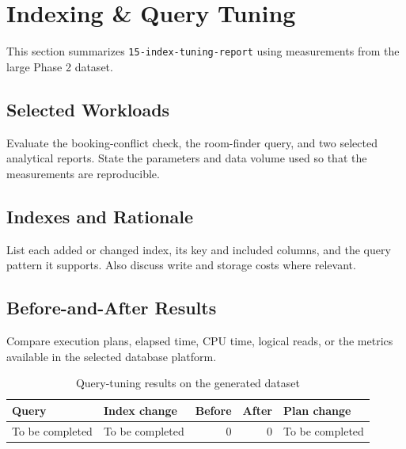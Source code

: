 \section{Indexing \& Query Tuning}
\label{sec:index-tuning}

This section summarizes \texttt{15-index-tuning-report} using measurements from
the large Phase 2 dataset.

\subsection{Selected Workloads}
Evaluate the booking-conflict check, the room-finder query, and two selected
analytical reports. State the parameters and data volume used so that the
measurements are reproducible.

\subsection{Indexes and Rationale}
List each added or changed index, its key and included columns, and the query
pattern it supports. Also discuss write and storage costs where relevant.

\subsection{Before-and-After Results}
Compare execution plans, elapsed time, CPU time, logical reads, or the metrics
available in the selected database platform.

\begin{table}[htbp]
    \centering
    \begin{tabularx}{\textwidth}{X X r r X}
        \toprule
        \textbf{Query} & \textbf{Index change} & \textbf{Before} & \textbf{After} & \textbf{Plan change} \\
        \midrule
        To be completed & To be completed & 0 & 0 & To be completed \\
        \bottomrule
    \end{tabularx}
    \caption{Query-tuning results on the generated dataset}
    \label{tab:index-tuning-results}
\end{table}